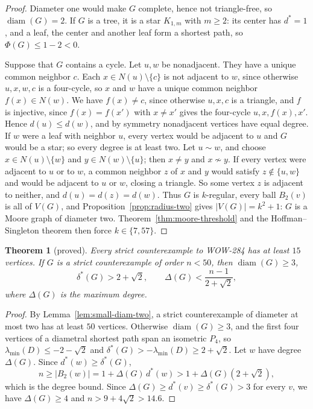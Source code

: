 \documentclass[a4paper,10pt,reqno]{amsart}
\theoremstyle{plain}
\newtheorem{theorem}{Theorem}[section]
\theoremstyle{definition}
\theoremstyle{remark}
\newcommand{\diam}{\operatorname{diam}}
\begin{document}
\begin{proof}
Diameter one would make \(G\) complete, hence not triangle-free, so
\(\diam(G)=2\). If \(G\) is a tree, it is a star \(K_{1,m}\) with \(m\ge2\):
its center has \(d^*=1\), and a leaf, the center and another leaf form a
shortest path, so \(\Phi(G)\le1-2<0\).

Suppose that \(G\) contains a cycle. Let \(u,w\) be nonadjacent. They have
a unique common neighbor \(c\). Each \(x\in N(u)\setminus\{c\}\) is not
adjacent to \(w\), since otherwise \(u,x,w,c\) is a four-cycle, so \(x\) and
\(w\) have a unique common neighbor \(f(x)\in N(w)\). We have \(f(x)\ne c\),
since otherwise \(u,x,c\) is a triangle, and \(f\) is injective, since
\(f(x)=f(x')\) with \(x\ne x'\) gives the four-cycle \(u,x,f(x),x'\). Hence
\(d(u)\le d(w)\), and by symmetry nonadjacent vertices have equal degree.
If \(w\) were a leaf with neighbor \(u\), every vertex would be adjacent to
\(u\) and \(G\) would be a star; so every degree is at least two. Let
\(u\sim w\), and choose \(x\in N(u)\setminus\{w\}\) and
\(y\in N(w)\setminus\{u\}\); then \(x\ne y\) and \(x\not\sim y\). If every
vertex were adjacent to \(u\) or to \(w\), a common neighbor \(z\) of \(x\)
and \(y\) would satisfy \(z\notin\{u,w\}\) and would be adjacent to \(u\) or
\(w\), closing a triangle. So some vertex \(z\) is adjacent to neither, and
\(d(u)=d(z)=d(w)\). Thus \(G\) is \(k\)-regular, every ball \(B_2(v)\) is all
of \(V(G)\), and Proposition~\ref{prop:radius-two} gives \(|V(G)|=k^2+1\): \(G\)
is a Moore graph of diameter two. Theorem~\ref{thm:moore-threshold} and the
Hoffman--Singleton theorem \cite{HoffmanSingleton1960} then force
\(k\in\{7,57\}\).
\end{proof}

\begin{theorem}[proved]\label{thm:fifteen-vertices}
Every strict counterexample to WOW-284 has at least \(15\) vertices. If
\(G\) is a strict counterexample of order \(n<50\), then \(\diam(G)\ge3\),
\[
 \delta^*(G)>2+\sqrt2,
 \qquad
 \Delta(G)<\frac{n-1}{2+\sqrt2},
\]
where \(\Delta(G)\) is the maximum degree.
\end{theorem}

\begin{proof}
By Lemma~\ref{lem:small-diam-two}, a strict counterexample of diameter at most
two has at least \(50\) vertices. Otherwise \(\diam(G)\ge3\), and the first
four vertices of a diametral shortest path span an isometric \(P_4\), so
\(\lambda_{\min}(D)\le-2-\sqrt2\) and
\(\delta^*(G)>-\lambda_{\min}(D)\ge2+\sqrt2\). Let \(w\) have degree
\(\Delta(G)\). Since \(d^*(w)\ge\delta^*(G)\),
\[
 n\ge|B_2(w)|=1+\Delta(G)\,d^*(w)>1+\Delta(G)(2+\sqrt2),
\]
which is the degree bound. Since \(\Delta(G)\ge d^*(v)\ge\delta^*(G)>3\) for
every \(v\), we have \(\Delta(G)\ge4\) and \(n>9+4\sqrt2>14.6\).
\end{proof}
\end{document}
